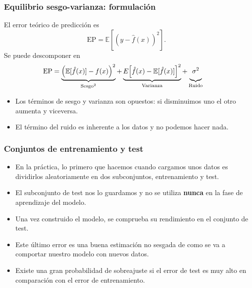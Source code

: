 \documentclass{beamer}
\newcommand{\Ebb}{\ensuremath{\mathbb{E}}}
\begin{document}
\begin{frame}
\frametitle{Equilibrio sesgo-varianza: formulación}

El error teórico de predicción es
%
\begin{equation*}
\text{EP} = \Ebb[(y - \hat{f}(x))^2].
\end{equation*}
%
Se puede descomponer en
%
\begin{align*}
\text{EP} &= \underbrace{\Bigl(\Ebb[\hat{f}(x)] - f(x) \Bigr)^2}_{\text{Sesgo}^2}
           + \underbrace{E\Bigl[\hat{f}(x) - \Ebb[\hat{f}(x)] \Bigr]^2}_{\text{Varianza}}
           + \underbrace{\vphantom{\Bigl(}\sigma^2}_{\text{Ruido}}
\end{align*}
%
\begin{itemize}
\item Los términos de sesgo y varianza son opuestos: si disminuimos uno el otro aumenta y viceversa.
\item El término del ruido es inherente a los datos y no podemos hacer nada.
\end{itemize}
\end{frame}

\begin{frame}
\frametitle{Conjuntos de entrenamiento y test}

\begin{itemize}
\item En la práctica, lo primero que hacemos cuando cargamos unos datos es dividirlos aleatoriamente en dos subconjuntos, entrenamiento y test.
\item El subconjunto de test nos lo guardamos y no se utiliza \textbf{nunca} en la fase de aprendizaje del modelo.
\item Una vez construido el modelo, se comprueba su rendimiento en el conjunto de test.
\item Este último error es una buena estimación no sesgada de como se va a comportar nuestro modelo con nuevos datos.
\item Existe una gran probabilidad de sobreajuste si el error de test es muy alto en comparación con el error de entrenamiento.
\end{itemize}
\end{frame}
\end{document}
